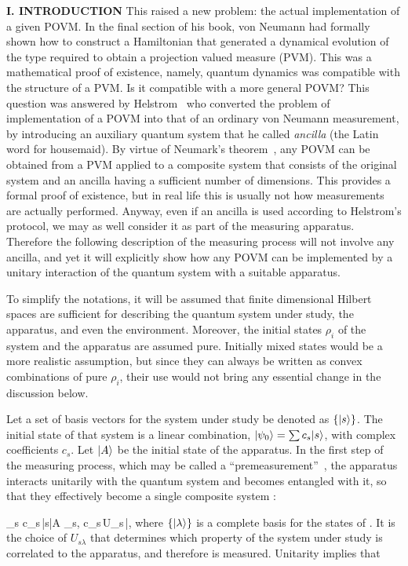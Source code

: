 \begin{center}{\bf I. INTRODUCTION}
This raised a new problem: the actual implementation of a given POVM. In
the final section of his book, von Neumann had formally shown how to
construct a Hamiltonian that generated a dynamical evolution of the type
required to obtain a projection valued measure (PVM). This was a
mathematical proof of existence, namely, quantum dynamics was compatible
with the structure of a PVM. Is it compatible with a more general POVM?
This question was answered by Helstrom~\cite{Hel} who converted the
problem of implementation of a POVM into that of an ordinary von Neumann
measurement, by introducing an auxiliary quantum system that he called
{\it ancilla\/} (the Latin word for housemaid). By virtue of Neumark's
theorem~\cite{Neu}, any POVM can be obtained from a PVM applied to a
composite system that consists of the original system and an ancilla
having a sufficient number of dimensions. This provides a formal proof
of existence, but in real life this is usually not how measurements are
actually performed. Anyway, even if an ancilla is used according to
Helstrom's protocol, we may as well consider it as part of the measuring
apparatus. Therefore the following description of the measuring process
will not involve any ancilla, and yet it will explicitly show how any
POVM can be implemented by a unitary interaction of the quantum system
with a suitable apparatus.

To simplify the notations, it will be assumed that finite dimensional
Hilbert spaces are sufficient for describing the quantum system under
study, the apparatus, and even the environment. Moreover, the initial
states $\rho_i$ of the system and the apparatus are assumed pure.
Initially mixed states would be a more realistic assumption, but since
they can always be written as convex combinations of pure $\rho_i$,
their use would not bring any essential change in the discussion below.

Let a set of basis vectors for the system under study be denoted as
$\{|s\rangle\}$. The initial state of that system is a linear combination,
$|\psi_0\rangle=\sum c_s|s\rangle$, with complex coefficients $c_s$. Let $|A\rangle$ be
the initial state of the apparatus. In the first step of the measuring
process, which may be called a ``premeasurement''~\cite{undo}, the
apparatus interacts unitarily with the quantum system and becomes
entangled with it, so that they effectively become a single composite
system \cC:

\beq \sum_s c_s\,|s\9\0|A\9\to
  \sum_{s,\lambda} c_s\,U_{s\lambda}\,|\lambda\9,\label{premea}\eeq
where $\{|\lambda\rangle\}$ is a complete basis for the states of \cC. It is
the choice of $U_{s\lambda}$ that determines which property of the
system under study is correlated to the apparatus, and therefore is
measured. Unitarity implies that


\end{center}
